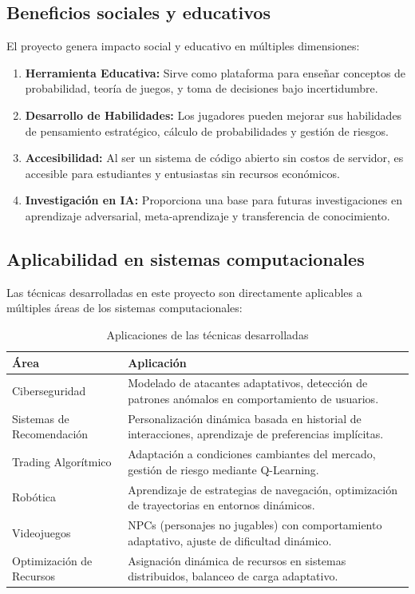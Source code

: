 \documentclass[12pt,a4paper]{article}
\begin{document}
\subsection{Beneficios sociales y educativos}

El proyecto genera impacto social y educativo en múltiples dimensiones:

\begin{enumerate}
    \item \textbf{Herramienta Educativa:} Sirve como plataforma para enseñar conceptos de probabilidad, teoría de juegos, y toma de decisiones bajo incertidumbre.
    
    \item \textbf{Desarrollo de Habilidades:} Los jugadores pueden mejorar sus habilidades de pensamiento estratégico, cálculo de probabilidades y gestión de riesgos.
    
    \item \textbf{Accesibilidad:} Al ser un sistema de código abierto sin costos de servidor, es accesible para estudiantes y entusiastas sin recursos económicos.
    
    \item \textbf{Investigación en IA:} Proporciona una base para futuras investigaciones en aprendizaje adversarial, meta-aprendizaje y transferencia de conocimiento.
\end{enumerate}

\subsection{Aplicabilidad en sistemas computacionales}

Las técnicas desarrolladas en este proyecto son directamente aplicables a múltiples áreas de los sistemas computacionales:

\begin{table}[H]
\centering
\caption{Aplicaciones de las técnicas desarrolladas}
\begin{tabular}{|p{4cm}|p{10cm}|}
\hline
\textbf{Área} & \textbf{Aplicación} \\
\hline
Ciberseguridad & Modelado de atacantes adaptativos, detección de patrones anómalos en comportamiento de usuarios. \\
\hline
Sistemas de Recomendación & Personalización dinámica basada en historial de interacciones, aprendizaje de preferencias implícitas. \\
\hline
Trading Algorítmico & Adaptación a condiciones cambiantes del mercado, gestión de riesgo mediante Q-Learning. \\
\hline
Robótica & Aprendizaje de estrategias de navegación, optimización de trayectorias en entornos dinámicos. \\
\hline
Videojuegos & NPCs (personajes no jugables) con comportamiento adaptativo, ajuste de dificultad dinámico. \\
\hline
Optimización de Recursos & Asignación dinámica de recursos en sistemas distribuidos, balanceo de carga adaptativo. \\
\hline
\end{tabular}
\label{tab:aplicaciones}
\end{table}
\end{document}
